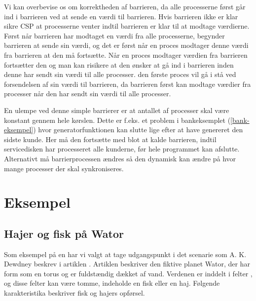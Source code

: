 Vi kan overbevise os om korrektheden af barrieren, da alle processerne først går ind i barrieren ved at sende en værdi til barrieren. Hvis barrieren ikke er klar sikre CSP at processerne venter indtil barrieren er klar til at modtage værdierne. Først når barrieren har modtaget en værdi fra alle processerne, begynder barrieren at sende sin værdi, og det er først når en proces modtager denne værdi fra barrieren at den må fortsætte. Når en proces modtager værdien fra barrieren fortsætter den og man kan risikere at den ønsker at gå ind i barrieren inden denne har sendt sin værdi til alle processer. den første proces vil gå i stå ved forsendelsen af sin værdi til barrieren, da barrieren først kan modtage værdier fra processer når den har sendt sin værdi til alle processer.

En ulempe ved denne simple barrierer er at antallet af processer skal være konstant gennem hele kørslen.
Dette er f.eks. et problem i bankeksemplet (\cref{bank-eksempel}) hvor generatorfunktionen kan slutte lige efter at have genereret den sidste kunde. Her må den fortsætte med blot at kalde barrieren, indtil servicedisken har processeret alle kunderne, før hele programmet kan afslutte. Alternativt må barrierprocessen ændres så den dynamisk kan ændre på hvor mange processer der skal synkroniseres. 


\section{Eksempel}


\subsection{Hajer og fisk på Wator} Som eksempel på en \des har vi valgt at tage 
udgangspunkt i det scenarie som A. K. Dewdney
beskrev i artiklen \cite{wator}. Artiklen beskriver den
fiktive planet Wator, der har form som en torus og er fuldstændig
dækket af vand. Verdenen er inddelt i felter \cite[20]{wator}, og disse felter kan være tomme, indeholde en
fisk eller en haj. Følgende karakteristika beskriver fisk og hajers
opførsel.

